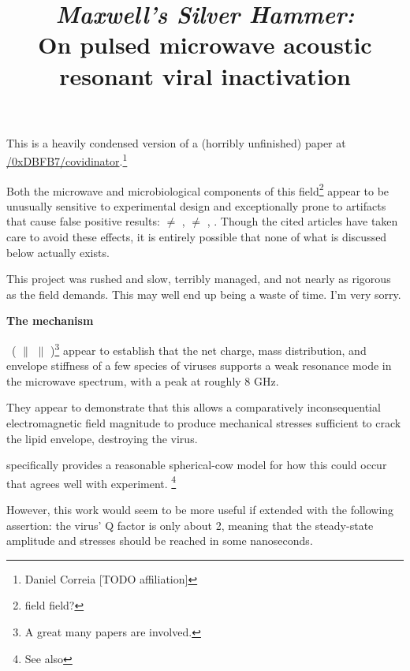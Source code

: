 \documentclass[fleqn,10pt]{paper}
\title{{\it Maxwell's Silver Hammer:}\\ On pulsed microwave acoustic resonant viral inactivation}
\begin{document}
\maketitle


This is a heavily condensed version of a (horribly unfinished) paper at \href{https://www.github.com/0xDBFB7/covidinator/documents/paper.pdf}{\faGithub/0xDBFB7/covidinator}.\footnote{Daniel Correia [TODO affiliation] }



Both the microwave and microbiological components of this field\footnote{field field?} appear to be unusually sensitive to experimental design and exceptionally prone to artifacts that cause false positive results: \cite{Microwave1982} $\neq$ \cite{Resonances1987}, \cite{Effects1985a} $\neq$ \cite{Cytogenetic1986}, \cite{Comprehensive2018}. Though the cited articles have taken care to avoid these effects, it is entirely possible that none of what is discussed below actually exists.  

This project was rushed and slow, terribly managed, and not nearly as rigorous as the field demands. This may well end up being a waste of time. I'm very sorry.


{\Large \textbf{The mechanism}}


\cite{Microwave2009} \textrightarrow \ (\cite{focusing2014} $\parallel$ \cite{Efficient2015} $\parallel$ \cite{Resonant2017})\footnote{A great many papers are involved.} appear to establish that the net charge, mass distribution, and envelope stiffness of a few species of viruses supports a weak resonance mode in the microwave spectrum, with a peak at roughly 8 GHz.

They appear to demonstrate that this allows a comparatively inconsequential electromagnetic field magnitude to produce mechanical stresses sufficient to crack the lipid envelope, destroying the virus.

\cite{Efficient2015} specifically provides a reasonable spherical-cow model for how this could occur that agrees well with experiment. \footnote{See also }

However, this work would seem to be more useful if extended with the following assertion: the virus' Q factor is only about 2, meaning that the steady-state amplitude and stresses should be reached in some nanoseconds.
\end{document}
